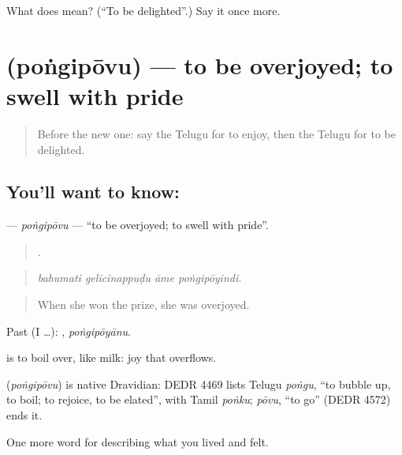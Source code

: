 \begin{tcolorbox}[breakable,colback=teal!4,colframe=teal!35!black,title={Before you move on}]
What does  mean? (\textquotedblleft{}To be delighted\textquotedblright{}.) Say it once more.
\end{tcolorbox}
\section[\texorpdfstring{\te{పొంగిపోవు} (poṅgipōvu)}{పొంగిపోవు (poṅgipōvu)}]{ (poṅgipōvu) — to be overjoyed; to swell with pride}

\label{lesson:TE-C500-pongipovu}



\begin{quote}
Before the new one: say the Telugu for to enjoy, then the Telugu for to be delighted.
\end{quote}

\subsection*{You'll want to know: }
\textbf{} — \emph{poṅgipōvu} — \textquotedblleft{}to be overjoyed; to swell with pride\textquotedblright{}.

\begin{quote}
   .
\end{quote}

\begin{quote}
\emph{bahumati gelicinappuḍu āme poṅgipōyindi.}
\end{quote}

\begin{quote}
When she won the prize, she was overjoyed.
\end{quote}

Past (I …): , \emph{poṅgipōyānu}.

 is to boil over, like milk: joy that overflows.

\begin{cousinweb}
\textbf{} (\emph{poṅgipōvu}) is native Dravidian: DEDR 4469 lists Telugu \emph{poṅgu}, \textquotedblleft{}to bubble up, to boil; to rejoice, to be elated\textquotedblright{}, with Tamil \emph{poṅku}; \emph{pōvu}, \textquotedblleft{}to go\textquotedblright{} (DEDR 4572) ends it.
\end{cousinweb}

\begin{grammarlens}[title={What you've built}]
One more word for describing what you lived and felt.
\end{grammarlens}


